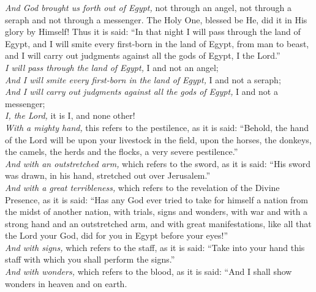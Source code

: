 \documentclass[a4paper,10pt,openany]{memoir}
\newcommand{\HgEllipsis}{\ensuremath{\left[\ldots\right]}}
\newcommand{\HgFill}{\vfill \hrule \vfill}
\newenvironment{HgEnglish}{\strut\\\noindent}{\vspace{1em}}
\begin{document}
\vspace{-1em}
{\small
\noindent
{\itshape And God brought us forth out of Egypt,} not through an angel, not through a seraph
and not through a messenger. The Holy One, blessed be He, did it in His glory by
Himself! Thus it is said: ``In that night I will pass through the land of Egypt, and I
will smite every first-born in the land of Egypt, from man to beast, and I will
carry out judgments against all the gods of Egypt, I the Lord.''\\[.5em]
  \phantom{MM} {\itshape I will pass through the land of Egypt,} I and not an
  angel;\\[.4em]
  \phantom{MM} {\itshape And I will smite every first-born in the land of Egypt,} I and not
  a seraph;\\[.4em]
  \phantom{MM} {\itshape And I will carry out judgments against all the gods of Egypt,} I and not a
  messenger;\\[.4em]
  \phantom{MM} {\itshape I, the Lord,} it is I, and none other!\\[1em]
{\itshape With a mighty hand,} this refers to the pestilence, as it is said:
``Behold, the hand of the Lord will be upon your livestock in the field, upon
the horses, the donkeys, the camels, the herds and the flocks, a very severe
pestilence.'' \\[1em]
{\itshape And with an outstretched arm,} which refers to the sword, as it is said: ``His
sword was drawn, in his hand, stretched out over Jerusalem.'' \\[1em]
{\itshape And with a great terribleness,} which refers to the revelation of the Divine
Presence, as it is said: ``Has any God ever tried to take for himself a nation
from the midst of another nation, with trials, signs and wonders, with war and
with a strong hand and an outstretched arm, and with great manifestations, like
all that the Lord your God, did for you in Egypt before your eyes!'' \\[1em]
{\itshape And with signs,} which refers to the staff, as it is said: ``Take into your
hand this staff with which you shall perform the signs.'' \\[1em]
{\itshape And with wonders,} which refers to the blood, as it is said: ``And I
shall show wonders in heaven and on earth.}


%
%
\end{document}
